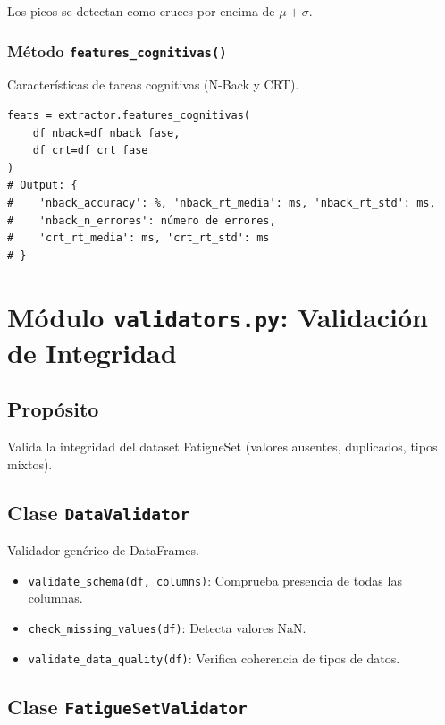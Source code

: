 \documentclass[12pt,a4paper]{article}
\begin{document}
Los picos se detectan como cruces por encima de $\mu + \sigma$.

\subsubsection{Método \texttt{features\_cognitivas()}}

Características de tareas cognitivas (N-Back y CRT).

\begin{lstlisting}
feats = extractor.features_cognitivas(
    df_nback=df_nback_fase,
    df_crt=df_crt_fase
)
# Output: {
#    'nback_accuracy': %, 'nback_rt_media': ms, 'nback_rt_std': ms,
#    'nback_n_errores': número de errores,
#    'crt_rt_media': ms, 'crt_rt_std': ms
# }
\end{lstlisting}

\section{Módulo \texttt{validators.py}: Validación de Integridad}

\subsection{Propósito}

Valida la integridad del dataset FatigueSet (valores ausentes, duplicados, tipos mixtos).

\subsection{Clase \texttt{DataValidator}}

Validador genérico de DataFrames.

\begin{itemize}
    \item \texttt{validate\_schema(df, columns)}: Comprueba presencia de todas las columnas.
    \item \texttt{check\_missing\_values(df)}: Detecta valores NaN.
    \item \texttt{validate\_data\_quality(df)}: Verifica coherencia de tipos de datos.
\end{itemize}

\subsection{Clase \texttt{FatigueSetValidator}}
\end{document}
